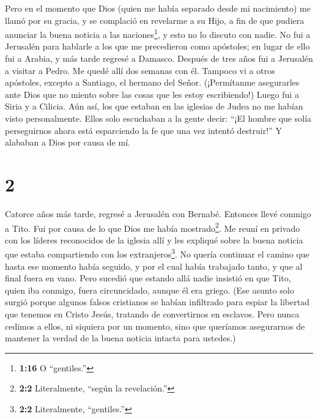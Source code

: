  Pero en el momento que Dios (quien me había separado desde
mi nacimiento) me llamó por su gracia, y se complació  en
revelarme a su Hijo, a fin de que pudiera anunciar la buena noticia a
las naciones\footnote{\textbf{1:16} O ``gentiles.''}, y esto no lo
discuto con nadie.  No fui a Jerusalén para hablarle a los
que me precedieron como apóstoles; en lugar de ello fui a Arabia, y más
tarde regresé a Damasco.  Después de tres años fui a
Jerusalén a visitar a Pedro. Me quedé allí dos semanas con él.
 Tampoco vi a otros apóstoles, excepto a Santiago, el
hermano del Señor.  (¡Permítanme asegurarles ante Dios que
no miento sobre las cosas que les estoy escribiendo!) 
Luego fui a Siria y a Cilicia.  Aún así, los que estaban en
las iglesias de Judea no me habían visto personalmente. 
Ellos solo escuchaban a la gente decir: ``¡El hombre que solía
perseguirnos ahora está esparciendo la fe que una vez intentó
destruir!''  Y alababan a Dios por causa de mí.

\hypertarget{section-1}{%
\section{2}\label{section-1}}

 Catorce años más tarde, regresé a Jerusalén con Bernabé.
Entonces llevé conmigo a Tito.  Fui por causa de lo que Dios
me había mostrado\footnote{\textbf{2:2} Literalmente, ``según la
  revelación.''}. Me reuní en privado con los líderes reconocidos de la
iglesia allí y les expliqué sobre la buena noticia que estaba
compartiendo con los extranjeros\footnote{\textbf{2:2} Literalmente,
  ``gentiles.''}. No quería continuar el camino que hasta ese momento
había seguido, y por el cual había trabajado tanto, y que al final fuera
en vano.  Pero sucedió que estando allá nadie insistió en
que Tito, quien iba conmigo, fuera circuncidado, aunque él era griego.
 (Ese asunto solo surgió porque algunos falsos cristianos se
habían infiltrado para espiar la libertad que tenemos en Cristo Jesús,
tratando de convertirnos en esclavos.  Pero nunca cedimos a
ellos, ni siquiera por un momento, sino que queríamos asegurarnos de
mantener la verdad de la buena noticia intacta para ustedes.)

